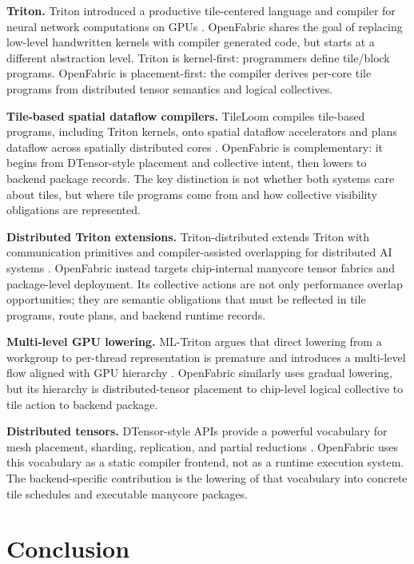 \documentclass[conference]{IEEEtran}
\newcommand{\systemname}{OpenFabric}
\begin{document}
\textbf{Triton.} Triton introduced a productive tile-centered language and
compiler for neural network computations on GPUs \cite{triton}. \systemname{}
shares the goal of replacing low-level handwritten kernels with compiler
generated code, but starts at a different abstraction level. Triton is
kernel-first: programmers define tile/block programs. \systemname{} is
placement-first: the compiler derives per-core tile programs from distributed
tensor semantics and logical collectives.

\textbf{Tile-based spatial dataflow compilers.} TileLoom compiles tile-based
programs, including Triton kernels, onto spatial dataflow accelerators and plans
dataflow across spatially distributed cores \cite{tileloom}. \systemname{} is
complementary: it begins from DTensor-style placement and collective intent,
then lowers to backend package records. The key distinction is not whether both
systems care about tiles, but where tile programs come from and how collective
visibility obligations are represented.

\textbf{Distributed Triton extensions.} Triton-distributed extends Triton with
communication primitives and compiler-assisted overlapping for distributed AI
systems \cite{triton_distributed}. \systemname{} instead targets chip-internal
manycore tensor fabrics and package-level deployment. Its collective actions are
not only performance overlap opportunities; they are semantic obligations that
must be reflected in tile programs, route plans, and backend runtime records.

\textbf{Multi-level GPU lowering.} ML-Triton argues that direct lowering from a
workgroup to per-thread representation is premature and introduces a multi-level
flow aligned with GPU hierarchy \cite{mltriton}. \systemname{} similarly uses
gradual lowering, but its hierarchy is distributed-tensor placement to
chip-level logical collective to tile action to backend package.

\textbf{Distributed tensors.} DTensor-style APIs provide a powerful vocabulary
for mesh placement, sharding, replication, and partial reductions \cite{dtensor}.
\systemname{} uses this vocabulary as a static compiler frontend, not as a
runtime execution system. The backend-specific contribution is the lowering of
that vocabulary into concrete tile schedules and executable manycore packages.

\section{Conclusion}
\end{document}
